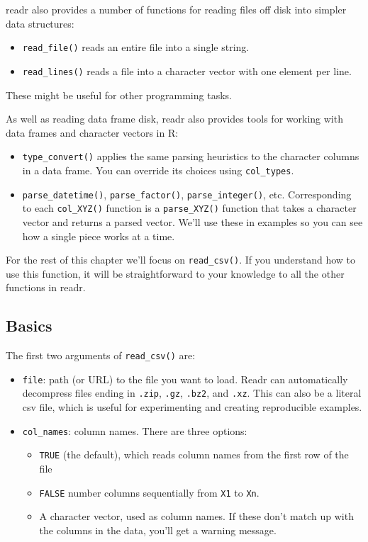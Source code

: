readr also provides a number of functions for reading files off disk
into simpler data structures:

\begin{itemize}
\item
  \texttt{read\_file()} reads an entire file into a single string.
\item
  \texttt{read\_lines()} reads a file into a character vector with one
  element per line.
\end{itemize}

These might be useful for other programming tasks.

As well as reading data frame disk, readr also provides tools for
working with data frames and character vectors in R:

\begin{itemize}
\item
  \texttt{type\_convert()} applies the same parsing heuristics to the
  character columns in a data frame. You can override its choices using
  \texttt{col\_types}.
\item
  \texttt{parse\_datetime()}, \texttt{parse\_factor()},
  \texttt{parse\_integer()}, etc. Corresponding to each
  \texttt{col\_XYZ()} function is a \texttt{parse\_XYZ()} function that
  takes a character vector and returns a parsed vector. We'll use these
  in examples so you can see how a single piece works at a time.
\end{itemize}

For the rest of this chapter we'll focus on \texttt{read\_csv()}. If you
understand how to use this function, it will be straightforward to your
knowledge to all the other functions in readr.

\subsection{Basics}

The first two arguments of \texttt{read\_csv()} are:

\begin{itemize}
\item
  \texttt{file}: path (or URL) to the file you want to load. Readr can
  automatically decompress files ending in \texttt{.zip}, \texttt{.gz},
  \texttt{.bz2}, and \texttt{.xz}. This can also be a literal csv file,
  which is useful for experimenting and creating reproducible examples.
\item
  \texttt{col\_names}: column names. There are three options:

  \begin{itemize}
  \item
    \texttt{TRUE} (the default), which reads column names from the first
    row of the file
  \item
    \texttt{FALSE} number columns sequentially from \texttt{X1} to
    \texttt{Xn}.
  \item
    A character vector, used as column names. If these don't match up
    with the columns in the data, you'll get a warning message.
  \end{itemize}
\end{itemize}

